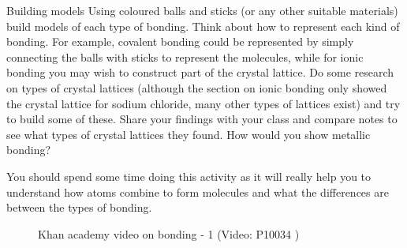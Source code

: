         \label{m38694*id754}
            \begin{activity}{Building models}
            \nopagebreak
        \label{m38694*id87434}Using coloured balls and sticks (or any other suitable materials) build models of each type of bonding. Think about how to represent each kind of bonding. For example, covalent bonding could be represented by simply connecting the balls with sticks to represent the molecules, while for ionic bonding you may wish to construct part of the crystal lattice. Do some research on types of crystal lattices (although the section on ionic bonding only showed the crystal lattice for sodium chloride, many other types of lattices exist) and try to build some of these. Share your findings with your class and compare notes to see what types of crystal lattices they found. How would you show metallic bonding?\par 
        \label{m38694*id8754}You should spend some time doing this activity as it will really help you to understand how atoms combine to form molecules and what the differences are between the types of bonding. \par 
\end{activity}
\label{m38694*eip-515}
    \setcounter{subfigure}{0}
	\begin{figure}[H] %
    \textnormal{Khan academy video on bonding - 1}\vspace{.1in} \nopagebreak
  \label{m38694*yt-media1}\label{m38694*yt-video1}
             { (Video:  P10034 )}
      \vspace{2pt}
    \vspace{.1in}
 \end{figure}       \par \label{m38694*secfhsst!!!underscore!!!id617}
